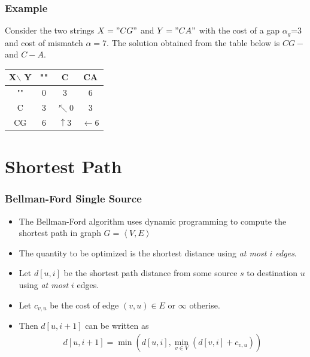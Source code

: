 \documentclass{beamer}
\begin{document}
\begin{frame}
  \frametitle{Example}
  Consider the two strings $X="CG"$ and $Y="CA"$ with the cost of a gap $\alpha_g$=3 and cost of mismatch $\alpha=7$.
  The solution obtained from the table below is $CG-$ and $C-A$.
  \center
  \begin{tabular}{|c|ccc|}
    \hline
    X$\backslash$ Y & "" & C & CA \\
    \hline
    "" & 0 & 3 & 6\\
    C  & 3 & $\nwarrow 0$ & 3\\
    CG & 6 & $\uparrow3 $ & $\leftarrow 6$\\
    \hline
  \end{tabular}
\end{frame}
\section{Shortest Path}

\begin{frame}
  \frametitle{Bellman-Ford Single Source}
  \begin{itemize}
  \item The Bellman-Ford algorithm uses dynamic programming to compute the shortest path in graph $G=\left<V,E\right>$
  \item The quantity to be optimized is the shortest distance using \textit{at most $i$ edges}.
  \item Let $d[u,i]$ be the shortest path distance from some source $s$ to destination $u$ using \textit{at most} $i$ edges.
\item Let $c_{v,u}$ be the cost of edge $(v,u)\in E$ or $\infty$ otherise.
  \item Then $d[u,i+1]$ can be written as 
    \begin{align*}
      d[u,i+1]=\min (d[u,i],\min_{v\in V}(d[v,i]+c_{v,u}))
    \end{align*}
  \end{itemize}
\end{frame}
\end{document}
